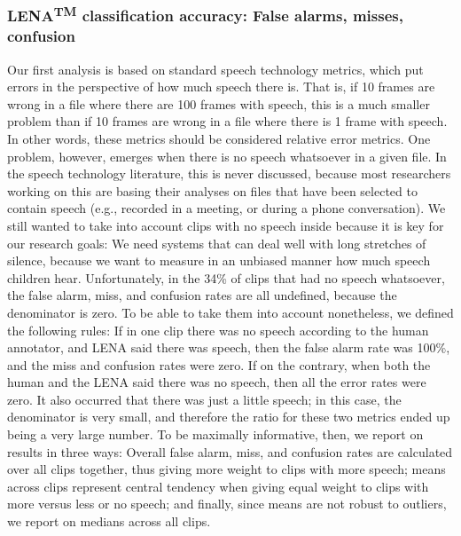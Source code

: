 \documentclass[english,floatsintext,man]{apa6}
\begin{document}
\subsubsection{\texorpdfstring{LENA\textsuperscript{TM} classification
accuracy: False alarms, misses,
confusion}{LENATM classification accuracy: False alarms, misses, confusion}}\label{lenatm-classification-accuracy-false-alarms-misses-confusion}

Our first analysis is based on standard speech technology metrics, which
put errors in the perspective of how much speech there is. That is, if
10 frames are wrong in a file where there are 100 frames with speech,
this is a much smaller problem than if 10 frames are wrong in a file
where there is 1 frame with speech. In other words, these metrics should
be considered relative error metrics. One problem, however, emerges when
there is no speech whatsoever in a given file. In the speech technology
literature, this is never discussed, because most researchers working on
this are basing their analyses on files that have been selected to
contain speech (e.g., recorded in a meeting, or during a phone
conversation). We still wanted to take into account clips with no speech
inside because it is key for our research goals: We need systems that
can deal well with long stretches of silence, because we want to measure
in an unbiased manner how much speech children hear. Unfortunately, in
the 34\% of clips that had no speech whatsoever, the false alarm, miss,
and confusion rates are all undefined, because the denominator is zero.
To be able to take them into account nonetheless, we defined the
following rules: If in one clip there was no speech according to the
human annotator, and LENA said there was speech, then the false alarm
rate was 100\%, and the miss and confusion rates were zero. If on the
contrary, when both the human and the LENA said there was no speech,
then all the error rates were zero. It also occurred that there was just
a little speech; in this case, the denominator is very small, and
therefore the ratio for these two metrics ended up being a very large
number. To be maximally informative, then, we report on results in three
ways: Overall false alarm, miss, and confusion rates are calculated over
all clips together, thus giving more weight to clips with more speech;
means across clips represent central tendency when giving equal weight
to clips with more versus less or no speech; and finally, since means
are not robust to outliers, we report on medians across all clips.
\end{document}
